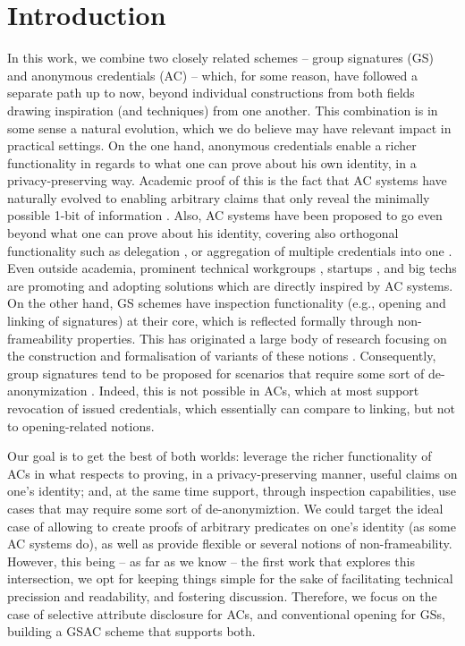 \section{Introduction}
\label{sec:introduction}

In this work, we combine two closely related schemes -- group signatures (GS)
and anonymous credentials (AC) -- which, for some reason, have followed a
separate path up to now, beyond individual constructions from both fields
drawing inspiration (and techniques) from one another. This combination is in
some sense a natural evolution, which we do believe may have relevant impact in
practical settings. On the one hand, anonymous credentials enable a richer
functionality in regards to what one can prove about his own identity, in a
privacy-preserving way. Academic proof of this is the fact that AC systems have
naturally evolved to enabling arbitrary claims that only reveal the minimally
possible 1-bit of information \needcite. Also, AC systems have been proposed to
go even beyond what one can prove about his identity, covering also orthogonal
functionality such as delegation \needcite, or aggregation of multiple
credentials into one \needcite. Even outside academia, prominent
technical workgroups \needcite, startups \needcite, and big techs \needcite are
promoting and adopting solutions which are directly inspired by AC systems. On
the other hand, GS 
schemes have inspection functionality (e.g., opening and linking of signatures)
at their core, which is reflected formally through non-frameability properties.
This has originated a large body of research focusing on the construction and
formalisation of variants of these notions \needcite. Consequently, group
signatures tend to be proposed for scenarios that require some sort of
de-anonymization \needcite. Indeed, this is not possible in ACs, which at most
support revocation of issued credentials, which essentially can compare to
linking, but not to opening-related notions.

Our goal is to get the best of both worlds: leverage the richer functionality
of ACs in what respects to proving, in a privacy-preserving manner, useful
claims on one's identity; and, at the same time support, through inspection
capabilities, use cases that may require some sort of de-anonymiztion. We
could target the ideal case of allowing to create proofs of arbitrary predicates
on one's identity (as some AC systems do), as well as provide flexible or several
notions of non-frameability. However, this being -- as far as we know -- the
first work that explores this intersection, we opt for keeping things simple
for the sake of facilitating technical precission and readability, and fostering
discussion. Therefore, we focus on the case of selective attribute disclosure
for ACs, and conventional opening for GSs, building a GSAC scheme that supports
both.


